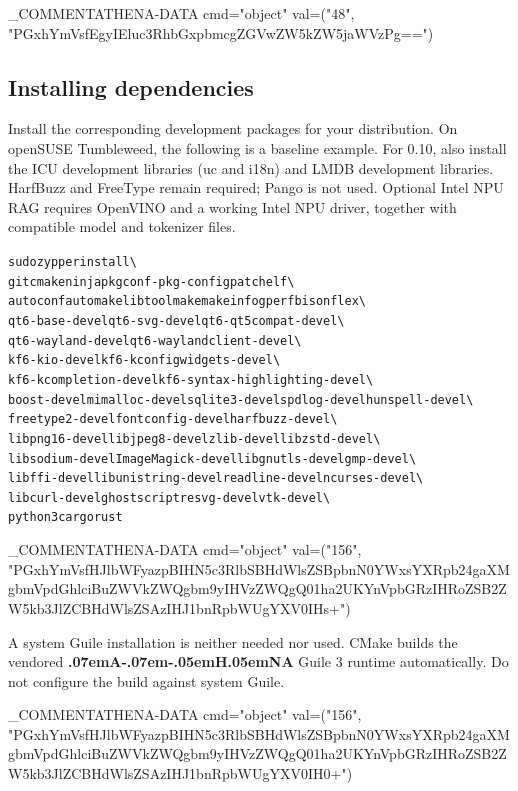 \documentclass{article}
\newcommand{\ATHENA}{\textbf{\kern.07emA\kern-.07em\raisebox{.25ex}{\scalebox{.7}{T}}\kern-.05emH\kern.05em\raisebox{-.25ex}{\scalebox{.7}{E}}NA}}
\newenvironment{tmcode}[1][]{\begin{alltt} }{\end{alltt}}
{\theorembodyfont{\rmfamily}\newtheorem{remark}{Remark}}
\begin{document}
\INLINE_COMMENT{ATHENA-DATA cmd="object" val=("48", "PGxhYmVsfEgyIEluc3RhbGxpbmcgZGVwZW5kZW5jaWVzPg==")}

\subsection{Installing dependencies}

Install the corresponding development packages for your distribution. On
openSUSE Tumbleweed, the following is a baseline example. For 0.10, also
install the ICU development libraries (uc and i18n) and LMDB development
libraries. HarfBuzz and FreeType remain required; Pango is not used.
Optional Intel NPU RAG requires OpenVINO and a working Intel NPU driver,
together with compatible model and tokenizer files.
\begin{tmcode}
sudo zypper install \textbackslash
  git cmake ninja pkgconf-pkg-config patchelf \textbackslash
  autoconf automake libtool make makeinfo gperf bison flex \textbackslash
  qt6-base-devel qt6-svg-devel qt6-qt5compat-devel \textbackslash
  qt6-wayland-devel qt6-waylandclient-devel \textbackslash
  kf6-kio-devel kf6-kconfigwidgets-devel \textbackslash
  kf6-kcompletion-devel kf6-syntax-highlighting-devel \textbackslash
  boost-devel mimalloc-devel sqlite3-devel spdlog-devel hunspell-devel \textbackslash
  freetype2-devel fontconfig-devel harfbuzz-devel \textbackslash
  libpng16-devel libjpeg8-devel zlib-devel libzstd-devel \textbackslash
  libsodium-devel ImageMagick-devel libgnutls-devel gmp-devel \textbackslash
  libffi-devel libunistring-devel readline-devel ncurses-devel \textbackslash
  libcurl-devel ghostscript resvg-devel vtk-devel \textbackslash
  python3 cargo rust
\end{tmcode}
\INLINE_COMMENT{ATHENA-DATA cmd="object" val=("156", "PGxhYmVsfHJlbWFyazpBIHN5c3RlbSBHdWlsZSBpbnN0YWxsYXRpb24gaXMgbmVpdGhlciBuZWVkZWQgbm9yIHVzZWQgQ01ha2UKYnVpbGRzIHRoZSB2ZW5kb3JlZCBHdWlsZSAzIHJ1bnRpbWUgYXV0IHs+")}

\begin{remark}
  A system Guile installation is neither needed nor used. CMake builds the
  vendored {\ATHENA} Guile 3 runtime automatically. Do not configure the build
  against system Guile.
\end{remark}

\INLINE_COMMENT{ATHENA-DATA cmd="object" val=("156", "PGxhYmVsfHJlbWFyazpBIHN5c3RlbSBHdWlsZSBpbnN0YWxsYXRpb24gaXMgbmVpdGhlciBuZWVkZWQgbm9yIHVzZWQgQ01ha2UKYnVpbGRzIHRoZSB2ZW5kb3JlZCBHdWlsZSAzIHJ1bnRpbWUgYXV0IH0+")}
\end{document}
